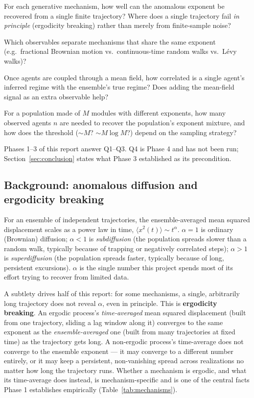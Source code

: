 \documentclass[11pt]{article}
\newcommand{\msd}{\ensuremath{\langle x^2(t)\rangle}}
\begin{document}
\begin{description}[leftmargin=2.2em, style=nextline]
\item[Q1 --- Estimator quality.] For each generative mechanism, how well can
  the anomalous exponent be recovered from a single finite trajectory? Where
  does a single trajectory fail \emph{in principle} (ergodicity breaking)
  rather than merely from finite-sample noise?
\item[Q2 --- Mechanism discrimination.] Which observables separate mechanisms
  that share the same exponent (e.g.\ fractional Brownian motion vs.\
  continuous-time random walks vs.\ L\'evy walks)?
\item[Q3 --- Single agent vs.\ collective.] Once agents are coupled through a
  mean field, how correlated is a single agent's inferred regime with the
  ensemble's true regime? Does adding the mean-field signal as an extra
  observable help?
\item[Q4 --- Sampling cost under heterogeneity.] For a population made of $M$
  modules with different exponents, how many observed agents $n$ are needed to
  recover the population's exponent mixture, and how does the threshold ($\sim
  M$? $\sim M\log M$?) depend on the sampling strategy?
\end{description}

Phases 1--3 of this report answer Q1--Q3. Q4 is Phase 4 and has not been run;
Section~\ref{sec:conclusion} states what Phase 3 established as its
precondition.

\subsection{Background: anomalous diffusion and ergodicity breaking}

For an ensemble of independent trajectories, the ensemble-averaged mean
squared displacement scales as a power law in time, $\msd \sim t^\alpha$.
$\alpha=1$ is ordinary (Brownian) diffusion; $\alpha<1$ is \emph{subdiffusion}
(the population spreads slower than a random walk, typically because of
trapping or negatively correlated steps); $\alpha>1$ is
\emph{superdiffusion} (the population spreads faster, typically because of
long, persistent excursions). $\alpha$ is the single number this project spends
most of its effort trying to recover from limited data.

A subtlety drives half of this report: for some mechanisms, a single,
arbitrarily long trajectory does not reveal $\alpha$, even in principle. This
is \textbf{ergodicity breaking}. An ergodic process's \emph{time-averaged} mean
squared displacement (built from one trajectory, sliding a lag window along
it) converges to the same exponent as the \emph{ensemble-averaged} one
(built from many trajectories at fixed time) as the trajectory gets long.
A non-ergodic process's time-average does not converge to the ensemble
exponent --- it may converge to a different number entirely, or it may keep a
persistent, non-vanishing spread across realizations no matter how long the
trajectory runs. Whether a mechanism is ergodic, and what its time-average
does instead, is mechanism-specific and is one of the central facts Phase 1
establishes empirically (Table~\ref{tab:mechanisms}).
\end{document}
